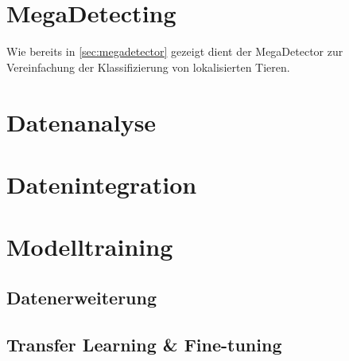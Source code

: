 \section{MegaDetecting}

Wie bereits in \autoref{sec:megadetector} gezeigt dient der MegaDetector zur Vereinfachung der Klassifizierung von lokalisierten Tieren.


\section{Datenanalyse}

\section{Datenintegration} \label{sec:dataintegration}

\section{Modelltraining}

\subsection{Datenerweiterung}

\subsection{Transfer Learning \& Fine-tuning}
